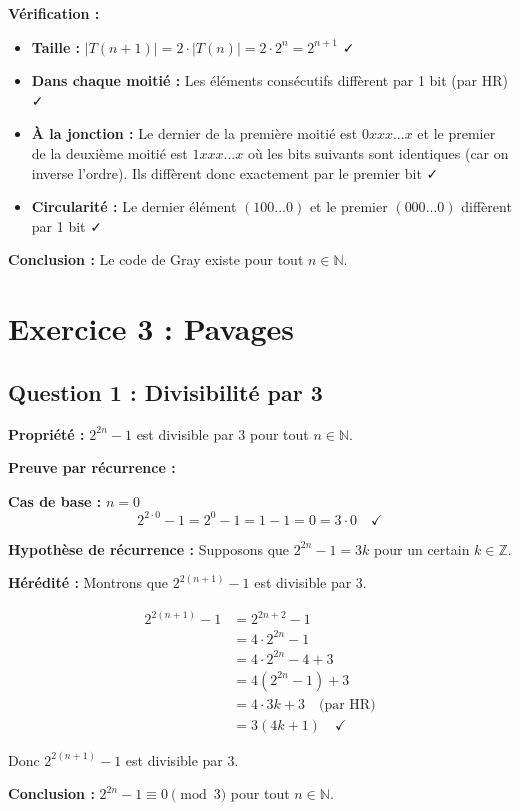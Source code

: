 \documentclass[12pt,a4paper]{article}
\begin{document}
\begin{demonstration}
\textbf{Vérification :}
\begin{itemize}
    \item \textbf{Taille :} $|T(n+1)| = 2 \cdot |T(n)| = 2 \cdot 2^n = 2^{n+1}$ ✓
    \item \textbf{Dans chaque moitié :} Les éléments consécutifs diffèrent par 1 bit (par HR) ✓
    \item \textbf{À la jonction :} Le dernier de la première moitié est $0xxx...x$ et le premier de la deuxième moitié est $1xxx...x$ où les bits suivants sont identiques (car on inverse l'ordre). Ils diffèrent donc exactement par le premier bit ✓
    \item \textbf{Circularité :} Le dernier élément $(100...0)$ et le premier $(000...0)$ diffèrent par 1 bit ✓
\end{itemize}

\textbf{Conclusion :} Le code de Gray existe pour tout $n \in \mathbb{N}$.
\end{demonstration}

\newpage
\section{Exercice 3 : Pavages}

\subsection{Question 1 : Divisibilité par 3}

\begin{demonstration}
\textbf{Propriété :} $2^{2n} - 1$ est divisible par 3 pour tout $n \in \mathbb{N}$.

\textbf{Preuve par récurrence :}

\textbf{Cas de base :} $n = 0$
$$2^{2 \cdot 0} - 1 = 2^0 - 1 = 1 - 1 = 0 = 3 \cdot 0 \quad ✓$$

\textbf{Hypothèse de récurrence :} Supposons que $2^{2n} - 1 = 3k$ pour un certain $k \in \mathbb{Z}$.

\textbf{Hérédité :} Montrons que $2^{2(n+1)} - 1$ est divisible par 3.

\begin{align*}
2^{2(n+1)} - 1 &= 2^{2n+2} - 1 \\
&= 4 \cdot 2^{2n} - 1 \\
&= 4 \cdot 2^{2n} - 4 + 3 \\
&= 4(2^{2n} - 1) + 3 \\
&= 4 \cdot 3k + 3 \quad \text{(par HR)} \\
&= 3(4k + 1) \quad ✓
\end{align*}

Donc $2^{2(n+1)} - 1$ est divisible par 3.

\textbf{Conclusion :} $2^{2n} - 1 \equiv 0 \pmod{3}$ pour tout $n \in \mathbb{N}$.
\end{demonstration}
\end{document}
